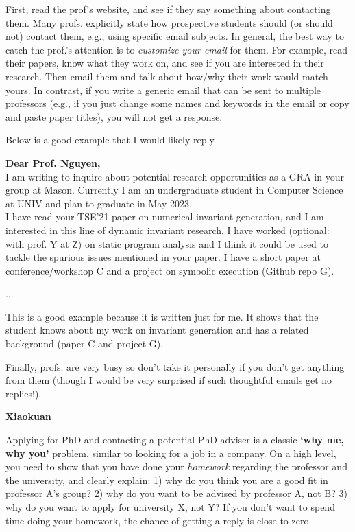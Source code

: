 \documentclass[oneside,11pt,dvipsnames]{book}
\newenvironment{commentbox}[1][]{
  \small
  \begin{mybox}
    {\small \textbf{#1}}
  }{
  \end{mybox}
}
\begin{document}
First, read the prof's website, and see if they say something about contacting them. Many profs. explicitly state how prospective students should (or should not) contact them, e.g., using specific email subjects.
In general, the best way to catch the prof.'s attention is to \emph{customize your email} for them.  For example, read their papers, know what they work on, and see if you are interested in their research. Then email them and talk about how/why their work would match yours.
In contrast, if you write a generic email that can be sent to multiple professors (e.g., if you just change some names and keywords in the email or copy and paste paper titles), you will not get a response.

Below is a good example that I would likely reply.

\begin{commentbox}[Dear Prof. Nguyen,]\\

  I am writing to inquire about potential research opportunities as a GRA in your group at Mason. Currently I am an undergraduate student in Computer Science at UNIV and plan to graduate in May 2023.
    \\

  I have read your TSE'21 paper on numerical invariant generation, and I am interested in this line of dynamic invariant research. I have worked (optional: with prof. Y at Z) on static program analysis and I think it could be used to tackle the spurious issues mentioned in your paper. I have a short paper at conference/workshop C and a project on symbolic execution (Github repo G).

  ...

 \tcblower
  This is a good example because it is written just for me.  It shows that the student knows about my work on invariant generation and has a related background (paper C and project G).
\end{commentbox}

Finally, profs. are very busy so don't take it personally if you don't get anything from them (though I would be very surprised if such thoughtful emails get no replies!).


\begin{commentbox}[Xiaokuan]
  Applying for PhD and contacting a potential PhD adviser is a classic \textbf{`why me, why you'} problem,
  similar to looking for a job in a company.
  On a high level,
  you need to show that you have done your \emph{homework}
  regarding the professor and the university,
  and clearly explain:
  1) why do you think you are a good fit in professor A's group?
  2) why do you want to be advised by professor A, not B?
  3) why do you want to apply for university X, not Y?
  If you don't want to spend time doing your homework,
  the chance of getting a reply is close to zero.
\end{commentbox}
\end{document}
